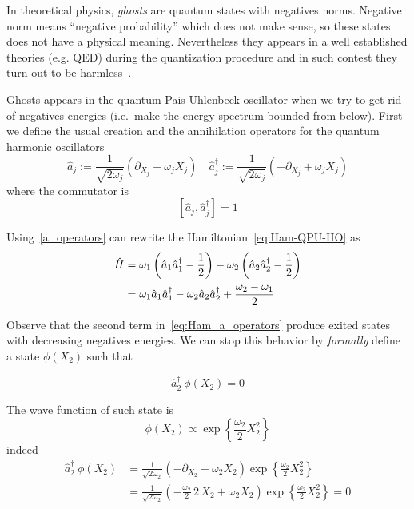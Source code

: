 In theoretical physics, \emph{ghosts} are quantum states with negatives norms.
Negative norm means ``negative probability'' which does not make sense, so
these states does not have a physical meaning. Nevertheless they appears in a
well established theories (e.g. QED) during the quantization procedure and in
such contest they turn out to be harmless~\cite{Smilga01}.

Ghosts appears in the quantum Pais-Uhlenbeck oscillator when we try to get rid
of negatives energies (i.e.\ make the energy spectrum bounded from below).
First we define the usual creation and the annihilation operators for the
quantum harmonic oscillators
\begin{equation} \label{a_operators}
  \hat{a}_j := \frac{1}{\sqrt{2\omega_j}}
    \left(\partial_{X_j} + \omega_j X_j\right) \quad
  \hat{a}_j^{\dagger} := \frac{1}{\sqrt{2\omega_j}}
    \left(-\partial_{X_j} + \omega_j X_j\right)
\end{equation}
where the commutator is
\begin{equation} \label{a_commutator}
  \left[ \hat{a}_j, \hat{a}_j^{\dagger} \right] = 1
\end{equation}

Using~\eqref{a_operators} can rewrite the Hamiltonian~\eqref{eq:Ham-QPU-HO} as
\begin{align} \label{eq:Ham_a_operators}
  \hat{H} &=
    \omega_1 \left( \hat{a}_1 \hat{a}_1^{\dagger} - \frac{1}{2} \right) -
    \omega_2 \left( \hat{a}_2 \hat{a}_2^{\dagger} - \frac{1}{2} \right) \notag
    \\    &=
    \omega_1 \hat{a}_1 \hat{a}_1^{\dagger} -
    \omega_2 \hat{a}_2 \hat{a}_2^{\dagger} +
    \frac{\omega_2 - \omega_1}{2}
\end{align}

Observe that the second term in~\eqref{eq:Ham_a_operators} produce exited states
with decreasing negatives energies. We can stop this behavior by \emph{formally}
define a state $\phi(X_2)$ such that

\begin{equation*}
  \hat{a}_2^{\dagger} \ \phi(X_2) = 0
\end{equation*}

The wave function of such state is~\cite{Ilhan13}
\begin{equation*}
  \phi(X_2) \propto \exp \left\{ \frac{\omega_2}{2} X_2^2\right\}
\end{equation*}
indeed
\begin{align*}
  \hat{a}_2^{\dagger} \ \phi(X_2)
  &= \frac{1}{\sqrt{2\omega_2}}
    \left(-\partial_{X_2} + \omega_2 X_2\right)
    \exp \left\{ \frac{\omega_2}{2} X_2^2\right\} \\
  &= \frac{1}{\sqrt{2\omega_2}}
    \left(-\frac{\omega_2}{2} \, 2 \, X_2 + \omega_2 X_2\right)
    \exp \left\{ \frac{\omega_2}{2} X_2^2\right\}
  = 0
\end{align*}

